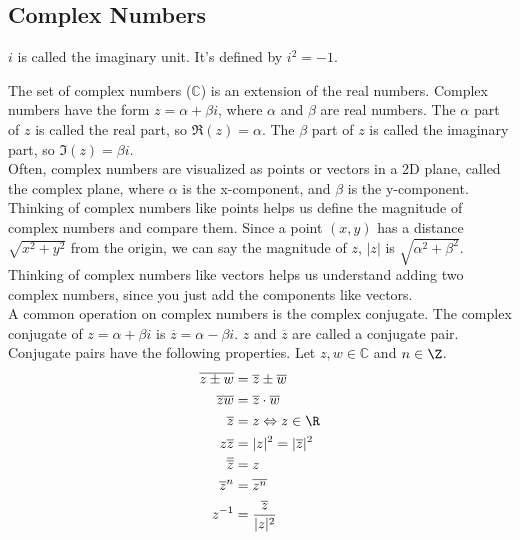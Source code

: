 \subsection{Complex Numbers}
\begin{definition}
	$i$ is called the imaginary unit. It's defined by $i^2 = -1$.
\end{definition}


\noindent
The set of complex numbers ($\mathbb{C}$) is an extension of the real numbers. Complex numbers have the form $z = \alpha + \beta i$, where $\alpha$ and $\beta$ are real numbers. The $\alpha$ part of $z$ is called the real part, so $\Re(z) = \alpha$. The $\beta$ part of $z$ is called the imaginary part, so $\Im(z) = \beta i$.\\

\noindent
Often, complex numbers are visualized as points or vectors in a 2D plane, called the complex plane, where $\alpha$ is the x-component, and $\beta$ is the y-component. Thinking of complex numbers like points helps us define the magnitude of complex numbers and compare them. Since a point $(x,y)$ has a distance $\sqrt{x^2+y^2}$ from the origin, we can say the magnitude of $z$, $\lvert z \rvert$ is $\sqrt{\alpha^2 + \beta^2}$. Thinking of complex numbers like vectors helps us understand adding two complex numbers, since you just add the components like vectors.\\

\noindent
A common operation on complex numbers is the complex conjugate. The complex conjugate of $z = \alpha + \beta i$ is $\overline{z} = \alpha - \beta i$. $z$ and $\overline{z}$ are called a conjugate pair.\\

\noindent
Conjugate pairs have the following properties.
Let $z, w \in \mathbb{C}$ and $n \in \Z$.
\begin{align*}
	\overline{z \pm w} &= \overline{z} \pm \overline{w} \\
	\overline{zw} &= \overline{z}\cdot\overline{w} \\
	\overline{z} &= z \Leftrightarrow z \in \R \\
	z\overline{z} &= \lvert z \rvert^2 = \lvert \overline{z} \rvert^2 \\
	\overline{\overline{z}} &= z \\
	\overline{z}^n &= \overline{z^n} \\
	z^{-1} &= \frac{\overline{z}}{\lvert z \rvert^2} 
\end{align*}
